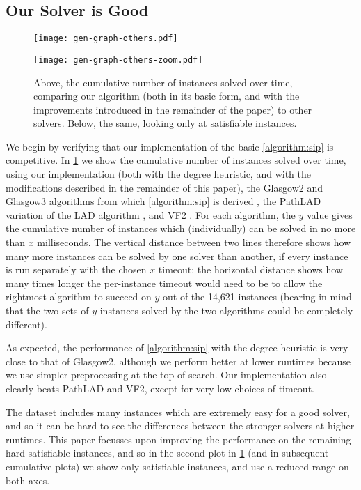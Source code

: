 \documentclass{article}
\newcommand{\citep}[1]{\cite{#1}}
\begin{document}
\subsection{Our Solver is Good}

\begin{figure}[tb]
    \centering
    \texttt{[image: gen-graph-others.pdf]}

    \bigskip

    \centering
    \texttt{[image: gen-graph-others-zoom.pdf]}

    \caption{Above, the cumulative number of instances solved over time, comparing our algorithm
    (both in its basic form, and with the improvements introduced in the remainder of the paper) to
    other solvers. Below, the same, looking only at satisfiable instances.}
    \label{figure:others}
\end{figure}

We begin by verifying that our implementation of the basic \cref{algorithm:sip} is competitive. In
\cref{figure:others} we show the cumulative number of instances solved over time, using our
implementation (both with the degree heuristic, and with the modifications described in the
remainder of this paper), the Glasgow2 and Glasgow3 algorithms from which \cref{algorithm:sip} is derived
\citep{DBLP:conf/cp/McCreeshP15,DBLP:conf/lion/KotthoffMS16}, the PathLAD variation of the LAD
algorithm \citep{DBLP:journals/ai/Solnon10,DBLP:conf/lion/KotthoffMS16}, and VF2
\citep{DBLP:journals/pami/CordellaFSV04}. For each algorithm, the $y$ value
gives the cumulative number of instances which (individually) can be solved in no more than $x$
milliseconds.  The vertical distance between two lines therefore shows how many more instances can
be solved by one solver than another, if every instance is run separately with the chosen $x$
timeout; the horizontal distance shows how many times longer the per-instance timeout would need to
be to allow the rightmost algorithm to succeed on $y$ out of the 14,621 instances (bearing in mind
that the two sets of $y$ instances solved by the two algorithms could be completely different).

As expected, the performance of \cref{algorithm:sip} with the degree heuristic is very close to that
of Glasgow2, although we perform better at lower runtimes because we use simpler preprocessing at
the top of search. Our implementation also clearly beats PathLAD and VF2, except for very low
choices of timeout.

The dataset includes many instances which are extremely easy for a good solver, and so it can be
hard to see the differences between the stronger solvers at higher runtimes. This paper focusses
upon improving the performance on the remaining hard satisfiable instances, and so in the second
plot in \cref{figure:others} (and in subsequent cumulative plots) we show only satisfiable
instances, and use a reduced range on both axes.
\end{document}
